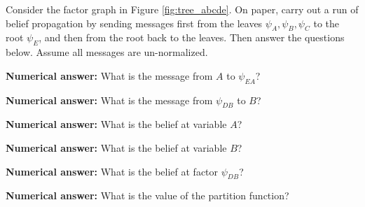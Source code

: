 \documentclass[11pt,addpoints,answers]{exam}
\numberwithin{equation}{section} %
\numberwithin{figure}{section} %
\numberwithin{table}{section} %
\begin{document}
\begin{questions}

\begin{EnvFullwidth}
Consider the factor graph in Figure \ref{fig:tree_abcde}. On paper, carry out a run of belief propagation by sending messages first from the leaves $\psi_{A}, \psi_{B}, \psi_{C}$ to the root $\psi_{E}$, and then from the root back to the leaves. Then answer the questions below. Assume all messages are un-normalized.
\end{EnvFullwidth}

\question[1] \textbf{Numerical answer:} What is the message from $A$ to $\psi_{EA}$? 
    \begin{tcolorbox}[fit,height=1cm, width=4cm, blank, borderline={1pt}{-2pt}]
    \end{tcolorbox}
    
\question[1] \textbf{Numerical answer:} What is the message from $\psi_{DB}$ to $B$? 
    \begin{tcolorbox}[fit,height=1cm, width=4cm, blank, borderline={1pt}{-2pt}]
    \end{tcolorbox}
 
\question[1] \textbf{Numerical answer:} What is the belief at variable $A$? 
    \begin{tcolorbox}[fit,height=1cm, width=4cm, blank, borderline={1pt}{-2pt}]
    \end{tcolorbox}
    
\question[1] \textbf{Numerical answer:} What is the belief at variable $B$? 
    \begin{tcolorbox}[fit,height=1cm, width=4cm, blank, borderline={1pt}{-2pt}]
    \end{tcolorbox}
    
\question[1] \textbf{Numerical answer:} What is the belief at factor $\psi_{DB}$? 
    \begin{tcolorbox}[fit,height=2cm, width=15cm, blank, borderline={1pt}{-2pt}]
    \end{tcolorbox}
    
\question[1] \textbf{Numerical answer:} What is the value of the partition function?
    \begin{tcolorbox}[fit,height=1cm, width=2cm, blank, borderline={1pt}{-2pt}]
    \end{tcolorbox}
    
\end{questions}
\end{document}

